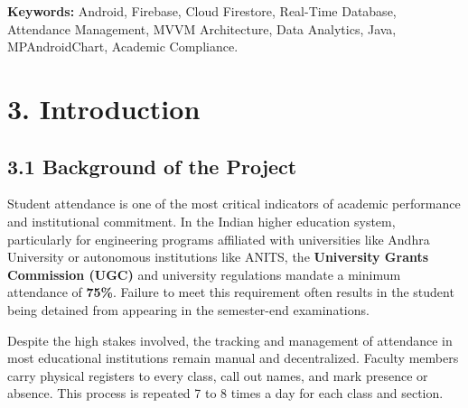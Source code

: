 \documentclass[12pt,a4paper]{report}
\begin{document}
\vspace{0.5cm}
\textbf{Keywords:} Android, Firebase, Cloud Firestore, Real-Time Database, Attendance Management, MVVM Architecture, Data Analytics, Java, MPAndroidChart, Academic Compliance.

\clearpage

\renewcommand{\contentsname}{Table of Contents}
\tableofcontents
\thispagestyle{fancy}
\clearpage


\chapter*{3. Introduction}

\section*{3.1 Background of the Project}
Student attendance is one of the most critical indicators of academic performance and institutional commitment. In the Indian higher education system, particularly for engineering programs affiliated with universities like Andhra University or autonomous institutions like ANITS, the \textbf{University Grants Commission (UGC)} and university regulations mandate a minimum attendance of \textbf{75\%}. Failure to meet this requirement often results in the student being detained from appearing in the semester-end examinations.

Despite the high stakes involved, the tracking and management of attendance in most educational institutions remain manual and decentralized. Faculty members carry physical registers to every class, call out names, and mark presence or absence. This process is repeated 7 to 8 times a day for each class and section.
\end{document}
